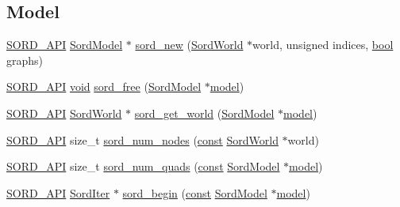 \subsection*{Model}
\begin{DoxyCompactItemize}
\item 
\hyperlink{sord_8h_a1a2e27663366eb6ff41e062a0a880f48}{S\+O\+R\+D\+\_\+\+A\+PI} \hyperlink{group__sord_gaea018cfebfedd10280b1d8dd6d650a28}{Sord\+Model} $\ast$ \hyperlink{group__sord_gac2d10de1c3b21b17c2d7eed4a5c7fd55}{sord\+\_\+new} (\hyperlink{group__sord_ga133d918ec58f829198b2cf65f250ed69}{Sord\+World} $\ast$world, unsigned indices, \hyperlink{mac_2config_2i386_2lib-src_2libsoxr_2soxr-config_8h_abb452686968e48b67397da5f97445f5b}{bool} graphs)
\item 
\hyperlink{sord_8h_a1a2e27663366eb6ff41e062a0a880f48}{S\+O\+R\+D\+\_\+\+A\+PI} \hyperlink{sound_8c_ae35f5844602719cf66324f4de2a658b3}{void} \hyperlink{group__sord_ga9e43e4eb96045ce7a07997267c813a15}{sord\+\_\+free} (\hyperlink{group__sord_gaea018cfebfedd10280b1d8dd6d650a28}{Sord\+Model} $\ast$\hyperlink{lib_2expat_8h_ac517f0c27408fbd365e7dd34e032faca}{model})
\item 
\hyperlink{sord_8h_a1a2e27663366eb6ff41e062a0a880f48}{S\+O\+R\+D\+\_\+\+A\+PI} \hyperlink{group__sord_ga133d918ec58f829198b2cf65f250ed69}{Sord\+World} $\ast$ \hyperlink{group__sord_ga27a0540b02602c5aeb3db056f903e6af}{sord\+\_\+get\+\_\+world} (\hyperlink{group__sord_gaea018cfebfedd10280b1d8dd6d650a28}{Sord\+Model} $\ast$\hyperlink{lib_2expat_8h_ac517f0c27408fbd365e7dd34e032faca}{model})
\item 
\hyperlink{sord_8h_a1a2e27663366eb6ff41e062a0a880f48}{S\+O\+R\+D\+\_\+\+A\+PI} size\+\_\+t \hyperlink{group__sord_ga97b4cb950f59a16efec5767c80f03a19}{sord\+\_\+num\+\_\+nodes} (\hyperlink{getopt1_8c_a2c212835823e3c54a8ab6d95c652660e}{const} \hyperlink{group__sord_ga133d918ec58f829198b2cf65f250ed69}{Sord\+World} $\ast$world)
\item 
\hyperlink{sord_8h_a1a2e27663366eb6ff41e062a0a880f48}{S\+O\+R\+D\+\_\+\+A\+PI} size\+\_\+t \hyperlink{group__sord_ga8f9c599ef7e60a5fd0af126a5f983cfb}{sord\+\_\+num\+\_\+quads} (\hyperlink{getopt1_8c_a2c212835823e3c54a8ab6d95c652660e}{const} \hyperlink{group__sord_gaea018cfebfedd10280b1d8dd6d650a28}{Sord\+Model} $\ast$\hyperlink{lib_2expat_8h_ac517f0c27408fbd365e7dd34e032faca}{model})
\item 
\hyperlink{sord_8h_a1a2e27663366eb6ff41e062a0a880f48}{S\+O\+R\+D\+\_\+\+A\+PI} \hyperlink{group__sord_ga59314650e0ab9b1cdeebc0bf7a0419fa}{Sord\+Iter} $\ast$ \hyperlink{group__sord_gaf85f5c99b6cb5a6f2a7267d86cc17de8}{sord\+\_\+begin} (\hyperlink{getopt1_8c_a2c212835823e3c54a8ab6d95c652660e}{const} \hyperlink{group__sord_gaea018cfebfedd10280b1d8dd6d650a28}{Sord\+Model} $\ast$\hyperlink{lib_2expat_8h_ac517f0c27408fbd365e7dd34e032faca}{model})

\end{DoxyCompactItemize}
